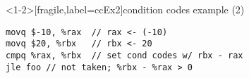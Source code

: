 

\begin{frame}<1-2>[fragile,label=ccEx2]{condition codes example (2)}
\begin{lstlisting}
movq $-10, %rax  // rax <- (-10)
movq $20, %rbx   // rbx <- 20
cmpq %rax, %rbx  // set cond codes w/ rbx - rax
jle foo // not taken; %rbx - %rax > 0
\end{lstlisting}
\end{frame}



